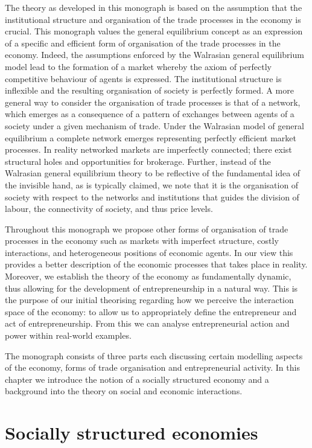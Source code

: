 The theory as developed in this monograph is based on the assumption that the institutional structure and organisation of the trade processes in the economy is crucial. This monograph values the general equilibrium concept as an expression of a specific and efficient form of organisation of the trade processes in the economy. Indeed, the assumptions enforced by the Walrasian general equilibrium model lead to the formation of a market whereby the axiom of perfectly competitive behaviour of agents is expressed. The institutional structure is inflexible and the resulting organisation of society is perfectly formed. A more general way to consider the organisation of trade processes is that of a network, which emerges as a consequence of a pattern of exchanges between agents of a society under a given mechanism of trade. Under the Walrasian model of general equilibrium a complete network emerges representing perfectly efficient market processes. In reality networked markets are imperfectly connected; there exist structural holes and opportunities for brokerage. Further, instead of the Walrasian general equilibrium theory to be reflective of the fundamental idea of the invisible hand, as is typically claimed, we note that it is the organisation of society with respect to the networks and institutions that guides the division of labour, the connectivity of society, and thus price levels.

Throughout this monograph we propose other forms of organisation of trade processes in the economy such as markets with imperfect structure, costly interactions, and heterogeneous positions of economic agents. In our view this provides a better description of the economic processes that takes place in reality. Moreover, we establish the theory of the economy as fundamentally dynamic, thus allowing for the development of entrepreneurship in a natural way. This is the purpose of our initial theorising regarding how we perceive the interaction space of the economy: to allow us to appropriately define the entrepreneur and act of entrepreneurship. From this we can analyse entrepreneurial action and power within real-world examples.

The monograph consists of three parts each discussing certain modelling aspects of the economy, forms of trade organisation and entrepreneurial activity. In this chapter we introduce the notion of a socially structured economy and a background into the theory on social and economic interactions.

\section{Socially structured economies}

